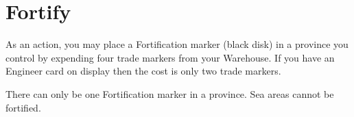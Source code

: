 \section{Fortify}

As an action, you may place a Fortification marker (black disk) in a province you control by expending four trade markers from your Warehouse. If you have an Engineer card on display then the cost is only two trade markers.

There can only be one Fortification marker in a province. Sea areas cannot be fortified.